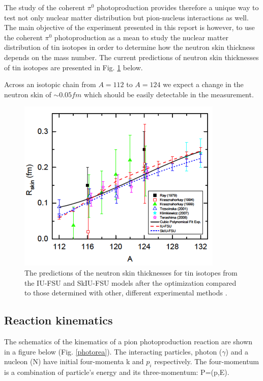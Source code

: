 \indent The study of the coherent $\pi^{0}$ photoproduction provides therefore a unique way to test not only nuclear matter distribution but pion-nucleus interactions as well. The main objective of the experiment presented in this report is however, to use the coherent $\pi^{0}$ photoproduction as a mean to study the nuclear matter distribution of tin isotopes in order to determine how the neutron skin thickness depends on the mass number. The current predictions of neutron skin thicknesses of tin isotopes are presented in Fig. \ref{tiniso} below.

\indent Across an isotopic chain from $A = 112$ to $A = 124$ we expect a change in the neutron skin of $\sim 0.05fm$ which should be easily detectable in the measurement.

\begin{figure}[H]
\begin{center}
\includegraphics[scale=0.8]{pictures/png/tiniso.png}
\caption{The predictions of the neutron skin thicknesses for tin isotopes from the IU-FSU and SkIU-FSU models after the optimization compared to those determined with other, different experimental methods \cite{fattoyev}.}
\label{tiniso}
\end{center}
\end{figure}

\subsection{Reaction kinematics}

\indent The schematics of the kinematics of a pion photoproduction reaction are shown in a figure below (Fig. \ref{photorea}). The interacting particles, photon ($\gamma$) and a nucleon (N) have initial four-momenta k and $p_{i}$ respectively. The four-momentum is a combination of particle's energy and its three-momentum: P=(p,E).

